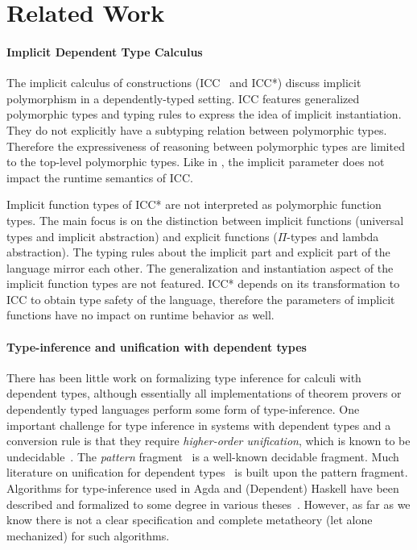 \section{Related Work}

\paragraph{Implicit Dependent Type Calculus}
The implicit calculus of constructions (ICC~\citep{miquel2001implicit} and
ICC*\citep{barras2008implicit}) discuss implicit polymorphism in a dependently-typed
setting. ICC features generalized polymorphic types and typing rules to express
the idea of implicit instantiation. They do not explicitly have a subtyping
relation between polymorphic types. Therefore the expressiveness of reasoning
between polymorphic types are limited to the top-level polymorphic types. Like
in \name, the implicit parameter does not impact the runtime semantics of ICC.

Implicit function types of ICC* are not interpreted as polymorphic
function types. The main focus is on the distinction between implicit
functions (universal types and implicit abstraction) and explicit functions
($\Pi$-types and lambda abstraction).
The typing rules about the implicit part and explicit part of the language mirror
each other. The generalization and instantiation aspect of the implicit function
types are not featured. ICC* depends on its transformation to ICC to obtain type safety
of the language, therefore the parameters of implicit functions have no impact
on runtime behavior as well.

\paragraph{Type-inference and unification with dependent types}
There has been little work on formalizing type inference for calculi
with dependent types, although essentially all implementations of
theorem provers or dependently typed languages perform some form of
type-inference.
One important challenge for type inference in
systems with dependent types and a conversion rule
is that they require \emph{higher-order unification},
which is known to be undecidable~\citep{goldfarb1981undecidability}. The \textit{pattern}
fragment~\citep{miller1991unification} is a well-known decidable
fragment. Much literature on unification for dependent
types~\citep{reed2009higher,abel2011higher, gundry2013tutorial, Cockx:2016:UEP:2951913.2951917, ziliani2015unification, coen2004mathematical} is
built upon the pattern fragment. Algorithms for type-inference used in Agda and
(Dependent) Haskell have been described and formalized to some degree
in various theses~\citep{norell,gundry,dh}. However, as far as we know
there is not a clear specification and complete metatheory (let alone
mechanized) for such algorithms.

